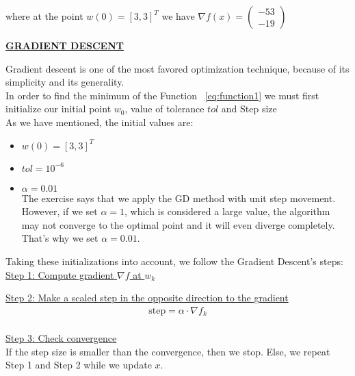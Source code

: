 where at the point $w\left(0\right) = \left[3, 3\right]^T$ we have $\nabla f(x) = \left(\begin{array}{c}
	-53 \\
	-19
\end{array}\right)$
\\[4mm]

\begin{center}
	\underline{\textbf{GRADIENT DESCENT}}
\end{center}
Gradient descent is one of the most favored optimization technique, because of its simplicity and its generality.\\
In order to find the minimum of the Function ~\ref{eq:function1} we must first initialize our initial point $w_{0}$, value of tolerance $tol$ and Step size\\
As we have mentioned, the initial values are:
\begin{itemize}
	\item $w\left(0\right) = \left[3, 3\right]^T$
	\item $tol = 10^{-6}$
	\item $\alpha = 0.01$\\
	The exercise says that we apply the GD method with unit step movement. However, if we set $\alpha = 1$, which is considered a large value, the algorithm may not converge to the optimal point and it will even diverge completely. That's why we set $\alpha = 0.01$. 
\end{itemize} 
\vspace{2mm}

Taking these initializations into account, we follow the Gradient Descent's steps:\\

\underline{Step 1: Compute gradient $\nabla f$ at $w_{k}$}
\vspace{4mm}

\underline{Step 2: Make a scaled step in the opposite direction to the gradient}\\
\begin{equation}
	\begin{gathered}
		\text{step} = \alpha \cdot \nabla f_{k}\\
	\end{gathered}
\end{equation}
\vspace{2mm}

\underline{Step 3: Check convergence}\\
If the step size is smaller than the convergence, then we stop. Else, we repeat Step 1 and Step 2 while we update $x$.
\vspace{4mm}

